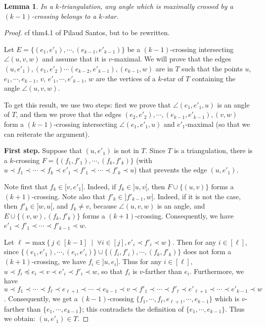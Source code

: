 \documentclass{amsart}
\newtheorem{lemma}[theorem]{Lemma}
\theoremstyle{remark}
\newcommand*{\ktg}[0]{$k$-triangulation\xspace}
\newcommand{\cl}{\prec}
\newcommand{\cle}{\preccurlyeq}
\newcommand{\set}[2]{\left\{ #1 \;\middle|\; #2 \right\}} %
\begin{document}
\begin{lemma}
In a \ktg, any angle which is maximally crossed by a $(k-1)$-crossing belongs to a $k$-star.
\end{lemma}
\begin{proof}
cf thm4.1 of  Pilaud Santos, but to be rewritten.





Let $E=\{(e_1,e'_1), \cdots , (e_{k-1},e'_{k-1})\}$ be a $(k - 1)$-crossing intersecting $\angle(u, v, w)$ and assume that it is $v$-maximal. 
We will prove that the edges $(u, e'_1),(e_1, e'_2)\cdots(e_{k-2}, e'_{k-1}), (e_{k-1}, w)$ are in $T$ such that the points $u$, $e_1,\cdots,e_{k-1}$, $v$, $e'_1,\cdots,e'_{k-1}$, $w$ are the vertices of a $k$-star of $T$ containing the angle $\angle(u, v, w)$. 

To get this result, we use two steps: first we prove that $\angle(e_1, e'_1, u)$ is an angle of $T$, and then we prove that the edges $(e_2,e'_2),\cdots, (e_{k-1},e'_{k-1}), (v, w)$ form a $(k-1)$-crossing intersecting $\angle(e_1, e'_1, u)$ and $e'_1$-maximal (so that we can reiterate the argument).

{\bf First step.}
Suppose that $(u, e'_1)$ is not in $T$. 
Since $T$ is a triangulation, there is a $k$-crossing $F=\{(f_1, f'_1),\cdots, (f_k, f'_k)\}$ (with $u \cl f_1 \cl \cdots \cl f_k \cl e'_1 \cl f'_1 \cl \cdots \cl f'_k \cl u$) that prevents the edge $(u, e'_1)$.

Note first that $f_k \in [v,e'_1[$. Indeed, if $f_k \in ]u, v[$, then $F \cup \{(u, v)\}$ forms a $(k + 1)$-crossing.
Note also that $f'_k \in ]f'_{k-1},w]$. Indeed, if it is not the case, then $f'_k \in ]w, u[$, and $f_k \neq v$, because $\angle(u, v, w)$ is an angle, and $E \cup \{(v,w),(f_k, f'_k)\}$ forms a $(k + 1)$-crossing. 
Consequently, we have $e'_1 \cl f'_1 \cl \cdots \cl f'_{k-1} \cl w$.

Let $\ell = \text{max}\set{j\in[k-1]}{\forall i\in[j],e'_i \cl f'_i \cl w}$.
Then for any $i\in[\ell]$, since $\{(e_1,e'_1), \cdots , (e_i,e'_i)\} \cup \{(f_i,f'_i), \cdots , (f_k,f'_k)\}$ does not form a $(k + 1)$-crossing, we have $f_i \in ]u, e_i]$. 
Thus for any $i\in[\ell]$, $u \cl f_i \cle e_i \cl v \cl e'_i \cl f'_i \cl w$, so that $f_i$ is $v$-farther than $e_i$.
Furthermore, we have $u \cl f_1 \cl \cdots \cl f_\ell \cl e_{\ell+1} \cl \cdots \cl e_{k-1} \cl v \cl f'_1 \cl \cdots \cl f'_\ell \cl e'_{\ell+1} \cl \cdots \cl e'_{k-1} \cl w$. 
Consequently, we get a $(k - 1)$-crossing $\{f_1, \cdots , f_\ell
, e_{\ell+1}, \cdots , e_{k-1}\}$ which is $v$-farther than $\{e_1, \cdots , e_{k-1}\}$; this contradicts the definition of $\{e_1, \cdots , e_{k-1}\}$. 
Thus we obtain: $(u, e'_1) \in  T$.


\end{proof}
\end{document}
